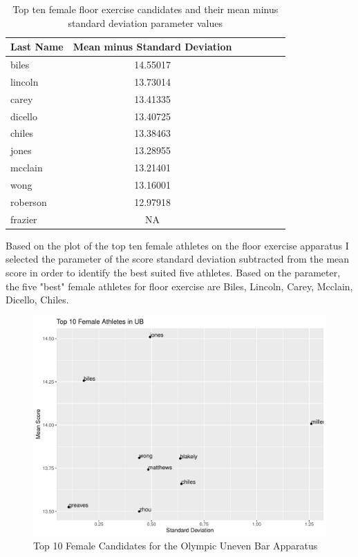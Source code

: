 \documentclass[12pt]{article}
\begin{document}
\begin{table}
  \caption{Top ten female floor exercise candidates and their mean minus standard deviation parameter values}
  \label{tab:tableFXP}
\centering
\begin{tabular}[t]{lccllll}
 \toprule
Last Name & Mean minus Standard Deviation\\
\midrule
biles & 14.55017\\
\midrule
lincoln & 13.73014\\
\midrule
carey & 13.41335\\
\midrule
dicello & 13.40725\\
\midrule
chiles & 13.38463\\
\midrule
jones & 13.28955\\
\midrule
mcclain & 13.21401\\
\midrule
wong & 13.16001\\
\midrule
roberson & 12.97918\\
\midrule
frazier & NA\\
\bottomrule
\end{tabular}
\end{table}

Based on the plot of the top ten female athletes on the floor exercise apparatus I selected the parameter of 
the score standard deviation subtracted from the mean score in order to identify the best suited five 
athletes. Based on the parameter, the five "best" female athletes for floor exercise are Biles, Lincoln, Carey, 
Mcclain, Dicello, Chiles.

\begin{figure}
  \centering
  \includegraphics[scale=0.6]{FemaleAthletesUB.pdf}
  \caption{Top 10 Female Candidates for the Olympic Uneven Bar Apparatus}
  \label{fig:UB}
\end{figure}
\end{document}
